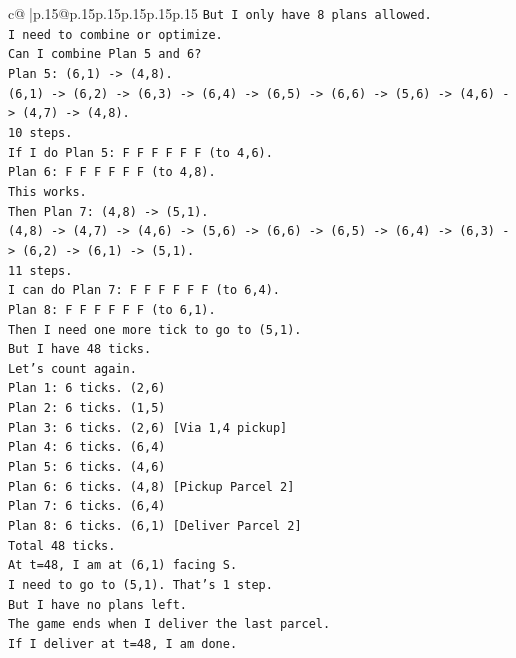 \documentclass{article}
\begin{document}
{\begin{supertabular}{c@{$\;$}|p{.15\linewidth}@{}p{.15\linewidth}p{.15\linewidth}p{.15\linewidth}p{.15\linewidth}p{.15\linewidth}}
{{{\texttt{But I only have 8 plans allowed.} \\
\texttt{I need to combine or optimize.} \\
\texttt{Can I combine Plan 5 and 6?} \\
\texttt{Plan 5: (6,1) {-}> (4,8).} \\
\texttt{(6,1) {-}> (6,2) {-}> (6,3) {-}> (6,4) {-}> (6,5) {-}> (6,6) {-}> (5,6) {-}> (4,6) {-}> (4,7) {-}> (4,8).} \\
\texttt{10 steps.} \\
\texttt{If I do Plan 5: F F F F F F (to 4,6).} \\
\texttt{Plan 6: F F F F F F (to 4,8).} \\
\texttt{This works.} \\
\texttt{Then Plan 7: (4,8) {-}> (5,1).} \\
\texttt{(4,8) {-}> (4,7) {-}> (4,6) {-}> (5,6) {-}> (6,6) {-}> (6,5) {-}> (6,4) {-}> (6,3) {-}> (6,2) {-}> (6,1) {-}> (5,1).} \\
\texttt{11 steps.} \\
\texttt{I can do Plan 7: F F F F F F (to 6,4).} \\
\texttt{Plan 8: F F F F F F (to 6,1).} \\
\texttt{Then I need one more tick to go to (5,1).} \\
\texttt{But I have 48 ticks.} \\
\texttt{Let's count again.} \\
\texttt{Plan 1: 6 ticks. (2,6)} \\
\texttt{Plan 2: 6 ticks. (1,5)} \\
\texttt{Plan 3: 6 ticks. (2,6) {[}Via 1,4 pickup{]}} \\
\texttt{Plan 4: 6 ticks. (6,4)} \\
\texttt{Plan 5: 6 ticks. (4,6)} \\
\texttt{Plan 6: 6 ticks. (4,8) {[}Pickup Parcel 2{]}} \\
\texttt{Plan 7: 6 ticks. (6,4)} \\
\texttt{Plan 8: 6 ticks. (6,1) {[}Deliver Parcel 2{]}} \\
\texttt{Total 48 ticks.} \\
\texttt{At t=48, I am at (6,1) facing S.} \\
\texttt{I need to go to (5,1). That's 1 step.} \\
\texttt{But I have no plans left.} \\
\texttt{The game ends when I deliver the last parcel.} \\
\texttt{If I deliver at t=48, I am done.} \\
}}}
\end{supertabular}}
\end{document}
